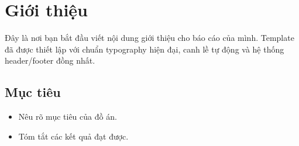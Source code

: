 \section{Giới thiệu}
\label{sec:intro}

Đây là nơi bạn bắt đầu viết nội dung giới thiệu cho báo cáo của mình. Template đã được thiết lập với chuẩn typography hiện đại, canh lề tự động và hệ thống header/footer đồng nhất.

\subsection{Mục tiêu}
\begin{itemize}
    \item Nêu rõ mục tiêu của đồ án.
    \item Tóm tắt các kết quả đạt được.
\end{itemize}
